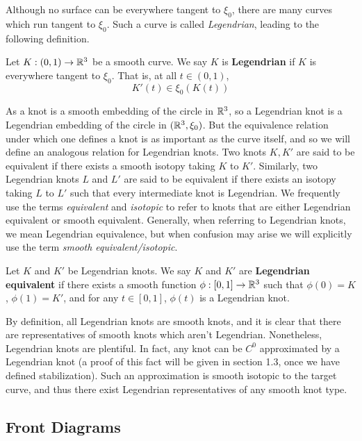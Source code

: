 Although no surface can be everywhere tangent to $\xi_0$, there are many curves which run tangent to $\xi_0$. Such a curve is called \emph{Legendrian}, leading to the following definition.

\begin{definition}
    Let $K: (0, 1) \to \mathbb{R}^3$ be a smooth curve. We say $K$ is \textbf{Legendrian} if $K$ is everywhere tangent to $\xi_0$. That is, at all $t \in (0, 1)$,
    \[
        K'(t) \in \xi_0(K(t))
    \]
\end{definition}

As a knot is a smooth embedding of the circle in $\mathbb{R}^3$, so a Legendrian knot is a Legendrian embedding of the circle in $(\mathbb{R}^3, \xi_0)$. But the equivalence relation under which one defines a knot is as important as the curve itself, and so we will define an analogous relation for Legendrian knots. Two knots $K, K'$ are said to be equivalent if there exists a smooth isotopy taking $K$ to $K'$. Similarly, two Legendrian knots $L$ and $L'$ are said to be equivalent if there exists an isotopy taking $L$ to $L'$ such that every intermediate knot is Legendrian.
We frequently use the terms \emph{equivalent} and \emph{isotopic} to refer to knots that are either Legendrian equivalent or smooth equivalent. Generally, when referring to Legendrian knots, we mean Legendrian equivalence, but when confusion may arise we will explicitly use the term \emph{smooth equivalent/isotopic}.

\begin{definition}
    Let $K$ and $K'$ be Legendrian knots. We say $K$ and $K'$ are \textbf{Legendrian equivalent} if there exists a smooth function $\phi: [0, 1] \to \mathbb{R}^3$ such that
    $\phi(0) = K$, $\phi(1) = K'$, and for any $t \in [0, 1]$, $\phi(t)$ is a Legendrian knot.
\end{definition}

By definition, all Legendrian knots are smooth knots, and it is clear that there are representatives of smooth knots which aren't Legendrian. Nonetheless, Legendrian knots are plentiful. In fact, any knot can be $C^0$ approximated by a Legendrian knot (a proof of this fact will be given in section 1.3, once we have defined stabilization).
Such an approximation is smooth isotopic to the target curve, and thus there exist Legendrian representatives of any smooth knot type.

\subsection{Front Diagrams}

